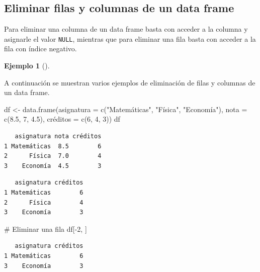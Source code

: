 \documentclass[
  a4paper,
]{scrreport}
\newenvironment{Shaded}{\begin{snugshade}}{\end{snugshade}}
\newcommand{\AttributeTok}[1]{\textcolor[rgb]{0.40,0.45,0.13}{#1}}
\newcommand{\CommentTok}[1]{\textcolor[rgb]{0.37,0.37,0.37}{#1}}
\newcommand{\ConstantTok}[1]{\textcolor[rgb]{0.56,0.35,0.01}{#1}}
\newcommand{\DecValTok}[1]{\textcolor[rgb]{0.68,0.00,0.00}{#1}}
\newcommand{\FloatTok}[1]{\textcolor[rgb]{0.68,0.00,0.00}{#1}}
\newcommand{\FunctionTok}[1]{\textcolor[rgb]{0.28,0.35,0.67}{#1}}
\newcommand{\NormalTok}[1]{\textcolor[rgb]{0.00,0.23,0.31}{#1}}
\newcommand{\OtherTok}[1]{\textcolor[rgb]{0.00,0.23,0.31}{#1}}
\newcommand{\SpecialCharTok}[1]{\textcolor[rgb]{0.37,0.37,0.37}{#1}}
\newcommand{\StringTok}[1]{\textcolor[rgb]{0.13,0.47,0.30}{#1}}
\theoremstyle{definition}
\newtheorem{example}{Ejemplo}[chapter]
\theoremstyle{definition}
\theoremstyle{remark}
\begin{document}
\hypertarget{eliminar-filas-y-columnas-de-un-data-frame}{%
\subsection{Eliminar filas y columnas de un data
frame}\label{eliminar-filas-y-columnas-de-un-data-frame}}

Para eliminar una columna de un data frame basta con acceder a la
columna y asignarle el valor \texttt{NULL}, mientras que para eliminar
una fila basta con acceder a la fila con índice negativo.

\leavevmode{}%
\begin{example}[]\label{exm-eliminacion-filas-columnas-data-frame}

A continuación se muestran varios ejemplos de eliminación de filas y
columnas de un data frame.

\begin{Shaded}
\begin{Highlighting}[]
\NormalTok{df }\OtherTok{\textless{}{-}} \FunctionTok{data.frame}\NormalTok{(}\AttributeTok{asignatura =} \FunctionTok{c}\NormalTok{(}\StringTok{"Matemáticas"}\NormalTok{, }\StringTok{"Física"}\NormalTok{, }\StringTok{"Economía"}\NormalTok{), }\AttributeTok{nota =} \FunctionTok{c}\NormalTok{(}\FloatTok{8.5}\NormalTok{, }\DecValTok{7}\NormalTok{, }\FloatTok{4.5}\NormalTok{), créditos }\OtherTok{=} \FunctionTok{c}\NormalTok{(}\DecValTok{6}\NormalTok{, }\DecValTok{4}\NormalTok{, }\DecValTok{3}\NormalTok{))}
\NormalTok{df}
\end{Highlighting}
\end{Shaded}

\begin{verbatim}
   asignatura nota créditos
1 Matemáticas  8.5        6
2      Física  7.0        4
3    Economía  4.5        3
\end{verbatim}

\begin{Shaded}
\end{Shaded}

\begin{verbatim}
   asignatura créditos
1 Matemáticas        6
2      Física        4
3    Economía        3
\end{verbatim}

\begin{Shaded}
\begin{Highlighting}[]
\CommentTok{\# Eliminar una fila}
\NormalTok{df[}\SpecialCharTok{{-}}\DecValTok{2}\NormalTok{, ]}
\end{Highlighting}
\end{Shaded}

\begin{verbatim}
   asignatura créditos
1 Matemáticas        6
3    Economía        3
\end{verbatim}

\end{example}
\end{document}
